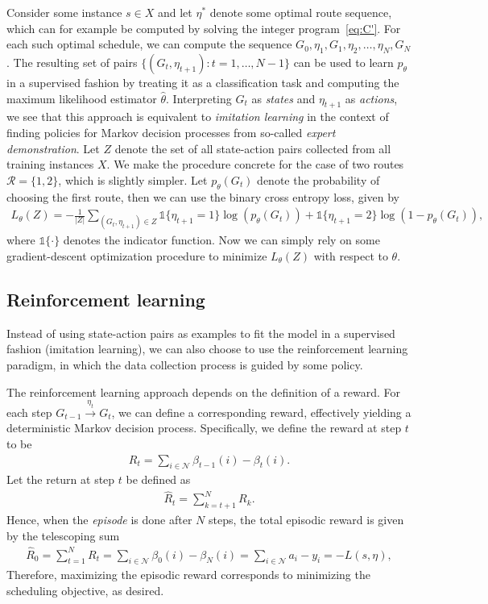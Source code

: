 \documentclass[a4paper]{report}
\theoremstyle{definition}
\theoremstyle{plain}
\begin{document}
Consider some instance $s \in X$ and let $\eta^{*}$ denote some optimal route
sequence, which can for example be computed by solving the integer
program~\eqref{eq:C'}. For each such optimal schedule, we can
compute the sequence $G_{0}, \eta_{1}, G_{1}, \eta_{2}, \dots, \eta_{N}, G_{N}$. The
resulting set of pairs $\{ (G_{t}, \eta_{t+1}) : t = 1, \dots, N - 1 \}$ can be used to
learn $p_{\theta}$ in a supervised fashion by treating it as a classification task
and computing the maximum likelihood estimator $\hat{\theta}$. Interpreting $G_{t}$
as \textit{states} and $\eta_{t+1}$ as \textit{actions}, we see that this approach is equivalent to \textit{imitation learning}
in the context of finding policies for Markov decision processes from so-called
\textit{expert demonstration}.
%
Let $Z$ denote the set of all state-action pairs collected from all
training instances $X$. We make the procedure concrete for the case of two
routes $\mathcal{R} = \{ 1, 2 \}$, which is slightly simpler. Let $p_{\theta}(G_{t})$
denote the probability of choosing the first route, then we can use the binary
cross entropy loss, given by
\begin{align*}
  L_{\theta}(Z) = - \frac{1}{|Z|} \sum_{(G_{t}, \eta_{t+1}) \in Z} \mathds{1}\{\eta_{t+1} = 1\} \log(p_{\theta}(G_{t})) + \mathds{1}\{\eta_{t+1} = 2\} \log(1 - p_{\theta}(G_{t})) ,
\end{align*}
where $\mathds{1}\{\cdot\}$ denotes the indicator function. Now we can simply rely on
some gradient-descent optimization procedure to minimize $L_{\theta}(Z)$ with
respect to $\theta$.

\subsection{Reinforcement learning}

Instead of using state-action pairs as examples to fit the model in a supervised
fashion (imitation learning), we can also choose to use the reinforcement
learning paradigm, in which the data collection process is guided by some
policy.

The reinforcement learning approach depends on the definition of a reward. For
each step $G_{t-1} \xrightarrow{\eta_{t}} G_{t}$, we can define a corresponding
reward, effectively yielding a deterministic Markov decision process.
Specifically, we define the reward at step $t$ to be
\begin{align*}
  R_{t} = \sum_{i \in \mathcal{N}} \beta_{t-1}(i) - \beta_{t}(i) .
\end{align*}
Let the return at step $t$ be defined as
\begin{align*}
  \hat{R}_{t} = \sum_{k=t + 1}^{N} R_{k} .
\end{align*}
Hence, when the \textit{episode} is done after $N$ steps, the total episodic
reward is given by the telescoping sum
\begin{align*}
  \hat{R}_{0} = \sum_{t=1}^{N} R_{t} = \sum_{i \in \mathcal{N}} \beta_{0}(i) - \beta_{N}(i)  = \sum_{i \in \mathcal{N}} a_{i} - y_{i} = - L(s, \eta) ,
\end{align*}
Therefore, maximizing the episodic reward corresponds to minimizing the
scheduling objective, as desired.
%
\end{document}

